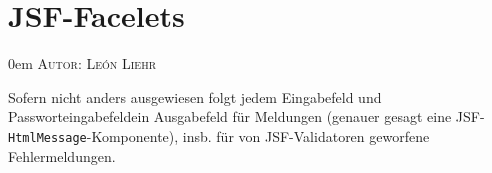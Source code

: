\documentclass{article}
\makeatletter
\newcommand{\sectionauthor}[1]{
	{\parindent 0em \large \scshape Autor: #1 \par \nobreak \vspace*{1em}}
	\@afterheading
}
\makeatother
\begin{document}
\section{JSF-Facelets}
\sectionauthor{León Liehr}


\newcommand{\PUB}{jeder}
\newcommand{\ANO}{Anon.}
\newcommand{\USR}{Nutzer}
\newcommand{\BIB}{Mitarbeiter}
\newcommand{\ADM}{Admin.}

\newcommand{\component}[2]{\subsubsection{#1 (\texttt{#2})}}
\newcommand{\page}[2]{
    \subsubsection{#1}
    \paragraph*{Dateipfad} \texttt{#2.xhtml}
}

\newcommand{\Javadoc}{\paragraph*{Javadoc}}

\newcommand{\BTN}{Knopf}
\newcommand{\LNK}{Hyperlink}
\newcommand{\INP}{Eingabefeld}
\newcommand{\PAS}{Passworteingabefeld}
\newcommand{\DRP}{Drop-Down-Liste}
\newcommand{\CHK}{Checkbox}
\newcommand{\OUT}{Ausgabefeld}
\newcommand{\LST}{Paginierte Liste}

\newenvironment{controls}
{
    \begin{table}[H]
        \centering
        \begin{tabular}{ p{7em} p{25em} p{7em} }
            \toprule
            \textbf{Typ} & \textbf{Beschreibung} & \textbf{Sichtbarkeit}\\
            \midrule
        }
        {
            \bottomrule
        \end{tabular}
    \end{table}
}

Sofern nicht anders ausgewiesen folgt jedem Eingabefeld und \PAS ein Ausgabefeld für Meldungen (genauer gesagt eine JSF-\texttt{HtmlMessage}-Komponente), insb. für von JSF-Validatoren geworfene Fehlermeldungen.
\end{document}
